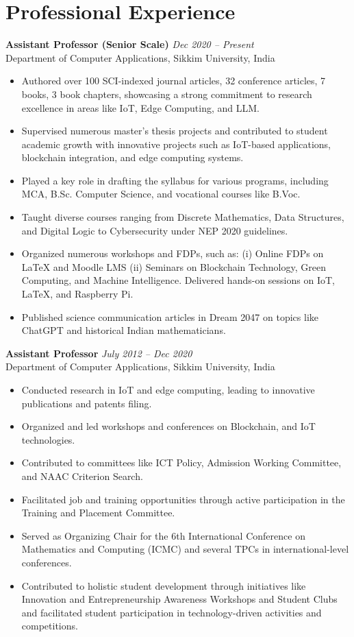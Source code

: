 \documentclass[10pt,a4paper]{article}
\begin{document}
	\section*{Professional Experience}
	
	\textbf{Assistant Professor (Senior Scale)} \hfill \textit{Dec 2020 -- Present}\\
	Department of Computer Applications, Sikkim University, India
	\begin{itemize}[leftmargin=0.2in]
		\item Authored over 100 SCI-indexed journal articles, 32 conference articles, 7 books, 3 book chapters, showcasing a strong commitment to research excellence in areas like IoT, Edge Computing, and LLM.
		\item Supervised numerous master’s thesis projects and contributed to student academic growth with innovative projects such as IoT-based applications, blockchain integration, and edge computing systems.
		\item Played a key role in drafting the syllabus for various programs, including MCA, B.Sc. Computer Science, and vocational courses like B.Voc.
		\item Taught diverse courses ranging from Discrete Mathematics, Data Structures, and Digital Logic to Cybersecurity under NEP 2020 guidelines.
		\item Organized numerous workshops and FDPs, such as: (i) Online FDPs on LaTeX and Moodle LMS (ii) Seminars on Blockchain Technology, Green Computing, and Machine Intelligence.
		Delivered hands-on sessions on IoT, LaTeX, and Raspberry Pi.
		\item Published science communication articles in Dream 2047 on topics like ChatGPT and historical Indian mathematicians.
	\end{itemize}
	
	\textbf{Assistant Professor} \hfill \textit{July 2012 -- Dec 2020}\\
	Department of Computer Applications, Sikkim University, India
	\begin{itemize}[leftmargin=0.2in]
		\item Conducted research in IoT and edge computing, leading to innovative publications and patents filing.
		\item Organized and led workshops and conferences on Blockchain, and IoT technologies.
		\item Contributed to committees like ICT Policy, Admission Working Committee, and NAAC Criterion Search.
		\item Facilitated job and training opportunities through active participation in the Training and Placement Committee.
		\item Served as Organizing Chair for the 6th International Conference on Mathematics and Computing (ICMC) and several TPCs in international-level conferences.
		\item Contributed to holistic student development through initiatives like Innovation and Entrepreneurship Awareness Workshops and Student Clubs and facilitated student participation in technology-driven activities and competitions.
	\end{itemize}
	
\end{document}
